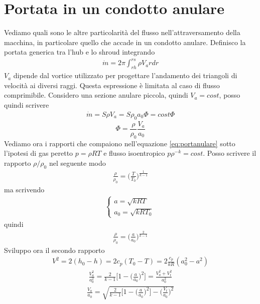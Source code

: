 \section{Portata in un condotto anulare}
Vediamo quali sono le altre particolarità del flusso nell'attraversamento della macchina, in particolare quello che accade in un condotto anulare. Definisco la portata generica tra l'hub e lo shroud integrando
\begin{align*}
\dot{m} = 2 \pi \int_{rh}^{rs} \rho V_a r dr
\end{align*}
$V_a$ dipende dal vortice utilizzato per progettare l'andamento dei triangoli di velocità ai diversi raggi. Questa espressione è limitata al caso di flusso comprimibile. Considero una sezione anulare piccola, quindi $V_a = cost$, posso quindi scrivere 
\begin{align*}
\dot{m} = S \rho V_a = S \rho_0 a_0 \Phi = cost \Phi
\end{align*}
\begin{equation}\label{eq:portanulare}
\Phi = \frac{\rho}{\rho_0} \frac{V_a}{a_0}
\end{equation}
Vediamo ora i rapporti che compaiono nell'equazione \ref{eq:portanulare} sotto l'ipotesi di gas peretto $p = \rho RT$ e flusso isoentropico $p \rho^{-k} = cost$.
Posso scrivere il rapporto $\rho/\rho_0$ nel seguente modo
\begin{align*}
\frac{\rho}{\rho_0} = \bigg( \frac{T}{T_0} \bigg)^{\frac{1}{k-1}} 
\end{align*}
ma scrivendo 
\begin{align*}
\begin{cases}
a = \sqrt{kRT}\\
a_0 = \sqrt{kRT_0}
\end{cases}
\end{align*}
quindi
\begin{align*}
\frac{\rho}{\rho_0} = \bigg( \frac{a}{a_0} \bigg)^{\frac{2}{k-1}}
\end{align*}
Sviluppo ora il secondo rapporto
\begin{align*}
V^2 = 2 (h_0 - h) = 2 c_p (T_0 - T) = 2 \frac{c_p}{kR} (a_0^2 - a^2)
\end{align*}
\begin{align*}
\frac{V_a^2}{a_0^2} = \frac{2}{k-1} \bigg[ 1- \bigg( \frac{a}{a_0} \bigg)^2 \bigg] = \frac{V_a^2 + V_t^2}{a_0^2}
\end{align*}
\begin{align*}
\boxed{ \frac{V_a}{a_0} = \sqrt{\frac{2}{k-1} \bigg[ 1- \bigg( \frac{a}{a_0} \bigg)^2 \bigg] - \bigg( \frac{V_t}{a_0} \bigg)^2} }
\end{align*}
